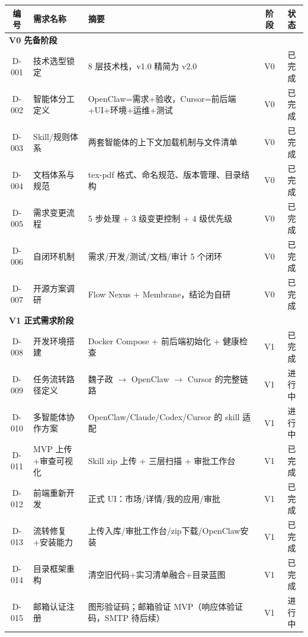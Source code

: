 \documentclass[11pt,a4paper]{article}
\begin{document}
\begin{table}[h]
\centering
\small
\begin{tabular}{clp{4.5cm}cc}
\toprule
\textbf{编号} & \textbf{需求名称} & \textbf{摘要} & \textbf{阶段} & \textbf{状态} \\
\midrule
\multicolumn{5}{l}{\textbf{V0 先备阶段}} \\
\midrule
D-001 & 技术选型锁定 & 8 层技术栈，v1.0 精简为 v2.0 & V0 & \textcolor{success}{已完成} \\
D-002 & 智能体分工定义 & OpenClaw=需求+验收，Cursor=前后端+UI+环境+运维+测试 & V0 & \textcolor{success}{已完成} \\
D-003 & Skill/规则体系 & 两套智能体的上下文加载机制与文件清单 & V0 & \textcolor{success}{已完成} \\
D-004 & 文档体系与规范 & tex-pdf 格式、命名规范、版本管理、目录结构 & V0 & \textcolor{success}{已完成} \\
D-005 & 需求变更流程 & 5 步处理 + 3 级变更控制 + 4 级优先级 & V0 & \textcolor{success}{已完成} \\
D-006 & 自闭环机制 & 需求/开发/测试/文档/审计 5 个闭环 & V0 & \textcolor{success}{已完成} \\
D-007 & 开源方案调研 & Flow Nexus + Membrane，结论为自研 & V0 & \textcolor{success}{已完成} \\
\midrule
\multicolumn{5}{l}{\textbf{V1 正式需求阶段}} \\
\midrule
D-008 & 开发环境搭建 & Docker Compose + 前后端初始化 + 健康检查 & V1 & \textcolor{success}{已完成} \\
D-009 & 任务流转路径定义 & 魏子政 $\to$ OpenClaw $\to$ Cursor 的完整链路 & V1 & \textcolor{progress}{进行中} \\
D-010 & 多智能体协作方案 & OpenClaw/Claude/Codex/Cursor 的 skill 适配 & V1 & \textcolor{progress}{进行中} \\
D-011 & MVP 上传+审查可视化 & Skill zip 上传 + 三层扫描 + 审批工作台 & V1 & \textcolor{success}{已完成} \\
D-012 & 前端重新开发 & 正式 UI：市场/详情/我的应用/审批 & V1 & \textcolor{success}{已完成} \\
D-013 & 流转修复+安装能力 & 上传入库/审批工作台/zip下载/OpenClaw安装 & V1 & \textcolor{success}{已完成} \\
D-014 & 目录框架重构 & 清空旧代码+实习清单融合+目录蓝图 & V1 & \textcolor{success}{已完成} \\
D-015 & 邮箱认证注册 & 图形验证码；邮箱验证 MVP（响应体验证码，SMTP 待后续） & V1 & \textcolor{progress}{进行中} \\

\end{tabular}
\end{table}
\end{document}

